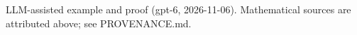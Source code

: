 \documentclass[11pt]{article}
\begin{document}

\bigskip
{\footnotesize LLM-assisted example and proof (gpt-6, 2026-11-06).
Mathematical sources are attributed above; see PROVENANCE.md.}
\end{document}
